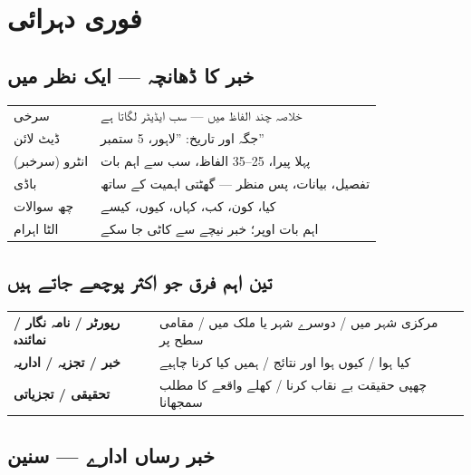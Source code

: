 
\section*{فوری دہرائی}

\subsection*{خبر کا ڈھانچہ --- ایک نظر میں}

\begin{center}
\begin{tabular}{@{}p{3.2cm} p{11.2cm}@{}}
\toprule
سرخی & خلاصہ چند الفاظ میں --- سب ایڈیٹر لگاتا ہے \\
ڈیٹ لائن & جگہ اور تاریخ: ''لاہور، \textenglish{5} ستمبر'' \\
انٹرو (سرخبر) & پہلا پیرا، \textenglish{25--35} الفاظ، سب سے اہم بات \\
باڈی & تفصیل، بیانات، پس منظر --- گھٹتی اہمیت کے ساتھ \\
\midrule
چھ سوالات & کیا، کون، کب، کہاں، کیوں، کیسے \\
الٹا اہرام & اہم بات اوپر؛ خبر نیچے سے کاٹی جا سکے \\
\bottomrule
\end{tabular}
\end{center}

\subsection*{تین اہم فرق جو اکثر پوچھے جاتے ہیں}

\begin{center}
\begin{tabular}{@{}p{3.4cm} p{11.0cm}@{}}
\toprule
\textbf{رپورٹر / نامہ نگار / نمائندہ}
  & مرکزی شہر میں / دوسرے شہر یا ملک میں / مقامی سطح پر \\
\textbf{خبر / تجزیہ / اداریہ}
  & کیا ہوا / کیوں ہوا اور نتائج / ہمیں کیا کرنا چاہیے \\
\textbf{تحقیقی / تجزیاتی}
  & چھپی حقیقت بے نقاب کرنا / کھلے واقعے کا مطلب سمجھانا \\
\bottomrule
\end{tabular}
\end{center}

\subsection*{خبر رساں ادارے --- سنین}


